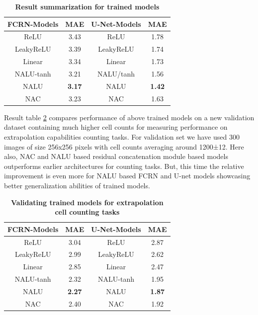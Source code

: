 \documentclass[conference]{IEEEtran}
\begin{document}
\bgroup
\def\arraystretch{1.25}
\begin{table}[h!]
  \begin{center}
    \caption{\textbf{Result summarization for trained models}}
    \label{tab:table2}
    \begin{tabular}{|c|c|c|c|}
    
    \hline
      \textbf{FCRN-Models} & \textbf{MAE} & \textbf{U-Net-Models} & \textbf{MAE} \\
    \hline

     ReLU  & 3.43 & ReLU & 1.78\\
     LeakyReLU  & 3.39 & LeakyReLU & 1.74\\
     Linear  & 3.34 & Linear & 1.73\\
	 NALU-tanh & 3.21 & NALU/tanh & 1.56\\
	 NALU & \textbf{3.17} & NALU & \textbf{1.42}\\
     NAC & 3.23 & NAC & 1.63\\
     
     \hline
     \end{tabular}
  \end{center}
\end{table}
\egroup

Result table \ref{tab:table3} compares performance of above trained models on a new validation dataset containing much higher cell counts for measuring performance on extrapolation capabilities counting tasks. For validation set we have used 300 images of size 256x256 pixels with cell counts averaging around 1200±12. Here also, NAC and NALU based residual concatenation module based models outperforms earlier architectures for counting tasks. But, this time the relative improvement is even more for NALU based FCRN and U-net models showcasing better generalization abilities of trained models.

\bgroup
\def\arraystretch{1.25}
\begin{table}[h!]
  \begin{center}
    \caption{\textbf{Validating trained models for extrapolation cell counting tasks}}
    \label{tab:table3}
    \begin{tabular}{|c|c|c|c|}
     
         \hline
      \textbf{FCRN-Models} & \textbf{MAE} & \textbf{U-Net-Models} & \textbf{MAE} \\
    \hline

     ReLU  & 3.04 & ReLU & 2.87\\
     LeakyReLU  & 2.99 & LeakyReLU & 2.62\\
     Linear  & 2.85 & Linear & 2.47\\
	 NALU-tanh & 2.32 & NALU-tanh & 1.95\\
	 NALU & \textbf{2.27} & NALU & \textbf{1.87}\\
     NAC & 2.40 & NAC & 1.92\\
    
     \hline
     \end{tabular}
  \end{center}
\end{table}
\egroup
\end{document}
